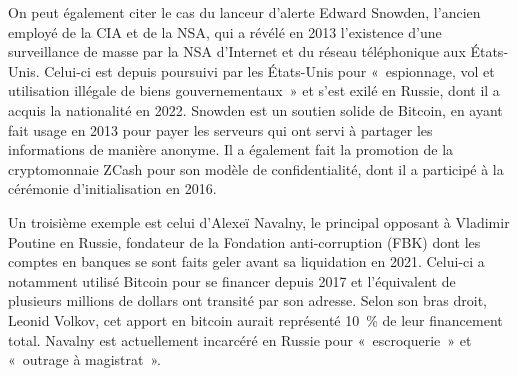 On peut également citer le cas du lanceur d'alerte Edward Snowden, l'ancien employé de la CIA et de la NSA, qui a révélé en 2013 l'existence d'une surveillance de masse par la NSA d'Internet et du réseau téléphonique aux États-Unis. Celui-ci est depuis poursuivi par les États-Unis pour «~espionnage, vol et utilisation illégale de biens gouvernementaux~» et s'est exilé en Russie, dont il a acquis la nationalité en 2022. Snowden est un soutien solide de Bitcoin, en ayant fait usage en 2013 pour payer les serveurs qui ont servi à partager les informations de manière anonyme. Il a également fait la promotion de la cryptomonnaie ZCash pour son modèle de confidentialité, dont il a participé à la cérémonie d'initialisation en 2016.

Un troisième exemple est celui d'Alexeï Navalny, le principal opposant à Vladimir Poutine en Russie, fondateur de la Fondation anti-corruption (FBK) dont les comptes en banques se sont faits geler avant sa liquidation en 2021. Celui-ci a notamment utilisé Bitcoin pour se financer depuis 2017 et l'équivalent de plusieurs millions de dollars ont transité par son adresse. Selon son bras droit, Leonid Volkov, cet apport en bitcoin aurait représenté 10~\% de leur financement total. Navalny est actuellement incarcéré en Russie pour «~escroquerie~» et «~outrage à magistrat~».

